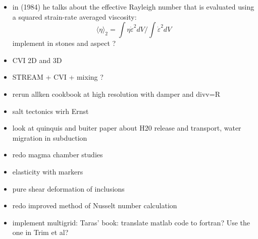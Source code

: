 \documentclass[a4paper]{article}
\begin{document}
\begin{itemize}
\item in \textcite{chri84} (1984) he talks about the effective Rayleigh number 
that is evaluated using a squared strain-rate averaged viscosity:
\[
\langle \eta \rangle_2 = \int \eta \dot{\varepsilon}^2 dV/\int \dot{\varepsilon}^2 dV
\]
implement in stones and aspect ?

\item CVI 2D and 3D

\item STREAM + CVI + mixing ?

\item rerun allken cookbook at high resolution with damper and divv=R
\item salt tectonics wirh Ernst \cite{veja92,vasv93,maar96,istt04,maqs06,maqs07,bakp14,feka14a}

\item look at quinquis and buiter paper about H20 release and transport, water migration in subduction
\item redo magma chamber studies \cite{cuwi14,gehn18}


\item elasticity with markers
\item pure shear deformation of inclusions \cite{trla00}
\cite{haoc78,haoc81,riha84,zhon96,como97,mohc98,zhzu00,lezh08,leha08,mofm07,mibb09,fope91,lizh13,bugo94} 
\item redo improved method of Nusselt number calculation \cite{hohr87}
\item implement multigrid: Taras' book: translate matlab code to fortran? Use the one in Trim et al?


\end{itemize}
\end{document}
